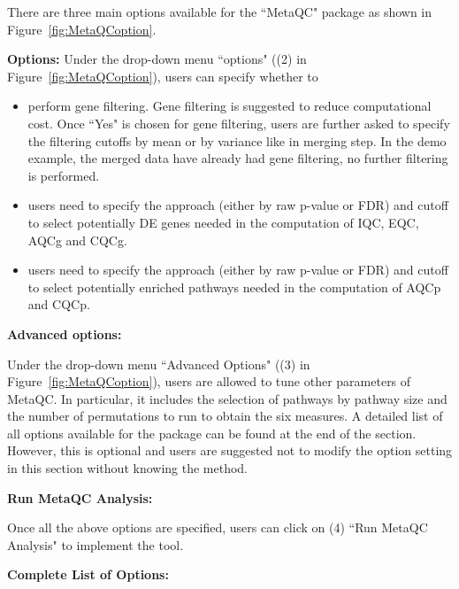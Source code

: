 There are three main options available for the ``MetaQC" package as shown in Figure~\ref{fig:MetaQCoption}. 

\begin{steps}
\item \textbf{Options:}
Under the drop-down menu ``options" ({\color{red}(2)} in Figure~\ref{fig:MetaQCoption}),
users can specify whether to 

\begin{itemize}
\item perform gene filtering. Gene filtering is suggested to reduce computational cost. Once ``Yes" is chosen for gene filtering, users are further asked to specify the filtering cutoffs by mean or by variance like in merging step. In the demo example, the merged data have already had gene filtering, no further filtering is performed. 
\item users need to specify the approach (either by raw p-value or FDR) and cutoff to select potentially DE genes needed in the computation of IQC, EQC, AQCg and CQCg.
\item users need to specify the approach (either by raw p-value or FDR) and cutoff to select potentially enriched pathways needed in the computation of AQCp and CQCp.
\end{itemize}

\item \textbf{Advanced options:}

Under the drop-down menu ``Advanced Options" ({\color{red}(3)} in Figure~\ref{fig:MetaQCoption}), users are allowed to tune other parameters of MetaQC.
In particular, it includes the selection of pathways by pathway size and the number of permutations to run to obtain the six measures. A detailed list of all options available for the package can be found at the end of the section. 
However, this is optional and users are suggested not to modify the option setting in this section without knowing the method. 

\item \textbf{Run MetaQC Analysis:}

Once all the above options are specified, users can click on {\color{red}(4)} ``Run MetaQC Analysis" to implement the tool. 

\end{steps}


\textbf{Complete List of Options:} 

